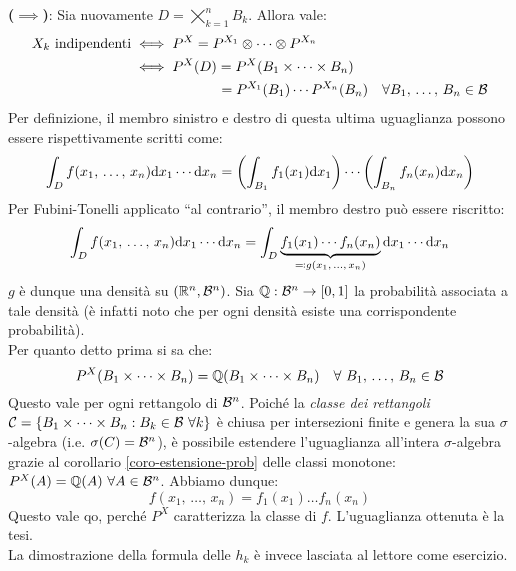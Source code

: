 \begin{dimo}
\begin{enumerate}
    \smallskip
    \textbf{($\implies$)}: Sia nuovamente $D = \bigtimes_{k=1}^n B_k$. Allora vale:
    \begin{align*}
      X_k \text{ indipendenti} & \iff P^X = P^{X_1} \otimes \dots \otimes P^{X_n} \\
      & \iff P^X(D) = P^X (B_1 \times \dots \times B_n) \\
      & \qquad \qquad\qquad\, = P^{X_1}(B_1) \cdots P^{X_n}(B_n) \quad \forall B_1, \, \dots, \, B_n \in \mathcal B
    \end{align*}
    Per definizione, il membro sinistro e destro di questa ultima uguaglianza possono essere rispettivamente scritti come:
    $$ \int_D f(x_1, \, \dots, \, x_n) \mathrm d x_1 \cdots \relax \mathrm d x_n = \left( \int_{B_1} f_1(x_1) \mathrm d x_1 \right) \cdots \relax \left( \int_{B_n} f_n(x_n) \mathrm d x_n \right)$$
    Per Fubini-Tonelli applicato ``al contrario'', il membro destro può essere riscritto:
    $$ \int_D f(x_1, \, \dots, \, x_n) \mathrm d x_1 \cdots \mathrm d x_n = \int_D \underbrace{f_1(x_1) \cdots f_n(x_n)}_{\eqqcolon g(x_1, \, \dots, \, x_n)} \mathrm d x_1 \cdots \mathrm d x_n$$
    $g$ è dunque una densità su $(\mathbb R^n, \mathcal B^n)$. Sia $\mathbb Q: \mathcal B^n \to [0,1]$ la probabilità associata a tale densità (è infatti noto che per ogni densità esiste una corrispondente probabilità). \\
    Per quanto detto prima si sa che:
    $$P^X(B_1 \times \dots \times B_n) = \mathbb Q(B_1 \times \dots \times B_n) \quad
    \forall \ B_1, \, \dots, \, B_n \in \mathcal B
    $$
    Questo vale per ogni rettangolo di $\mathcal B^n$. Poiché la \textit{classe dei rettangoli}
    $\mathcal C = \{ B_1 \times \dots \times B_n : B_k \in \mathcal B \ \forall k \}$
    è chiusa per intersezioni finite e genera la sua $\sigma$-algebra (i.e. $ \sigma(C) = \mathcal B^n$),
    è possibile estendere l'uguaglianza all'intera $\sigma$-algebra grazie al corollario \ref{coro-estensione-prob} delle classi monotone: $P^X(A) = \mathbb Q(A) \ \forall A \in \mathcal B^n$. Abbiamo dunque:
    $$f(x_1, \, \dots, \,  x_n) = f_1(x_1) \dots f_n(x_n)$$
    Questo vale qo, perché $P^X$ caratterizza la classe di $f$. L'uguaglianza ottenuta è la tesi. \\
    La dimostrazione della formula delle $h_k$ è invece lasciata al lettore come esercizio. \qedhere
  \end{enumerate}
\end{dimo}

